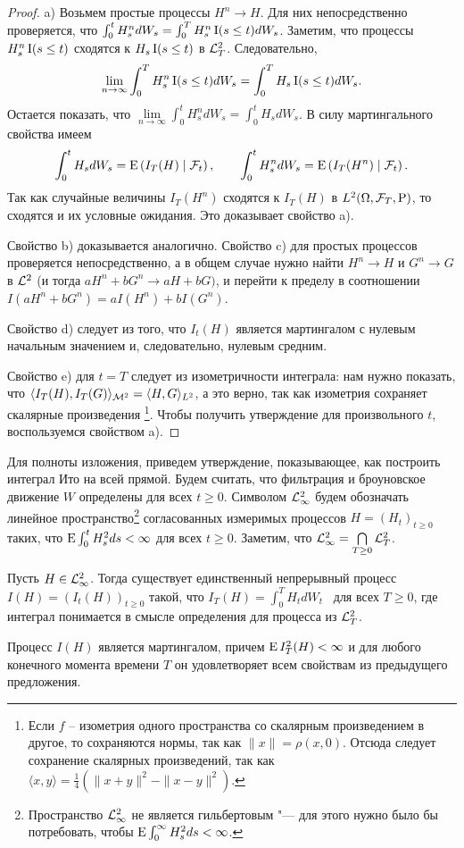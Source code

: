 \begin{proof}
a) Возьмем простые процессы $H^n\to H$.
Для них непосредственно проверяется, что $\int_0^t H_s^n d W_s = \int_0^T H_s^n \operatorname{I}(s\le t)d W_s$.
Заметим, что процессы $H_s^n \operatorname{I}(s\le t)$ сходятся к $H_s\operatorname{I}(s\le t)$ в $\mathcal{L}^2_T$.
Следовательно, 
\[
\lim\limits_{n\to\infty} \int_0^T H_s^n \operatorname{I}(s\le t)d W_s = \int_0^T H_s\operatorname{I}(s\le t) dW_s.
\]
Остается показать, что $\lim\limits_{n\to\infty} \int_0^t H_s^n d W_s = \int_0^t H_s d W_s$. 
В силу мартингального свойства имеем
\[
\int_0^t H_s dW_s = \operatorname{E}\left(I_T(H) \mid \mathcal{F}_t \right), \qquad
\int_0^t H_s^n dW_s = \operatorname{E}\left(I_T(H^n) \mid \mathcal{F}_t \right).
\]
Так как случайные величины $I_T(H^n)$ сходятся к $I_T(H)$ в $L^2(\Omega,\mathcal{F}_T,\mathrm{P})$, то сходятся и их условные ожидания.
Это доказывает свойство a).

Свойство b) доказывается аналогично.
Свойство c) для простых процессов проверяется непосредственно, а в общем случае нужно найти $H^n\to H$ и $G^n\to G$ в $\mathcal{L}^2$ (и тогда $aH^n+bG^n \to aH+bG)$, и перейти к пределу в соотношении $I(aH^n+bG^n) = aI(H^n) + bI(G^n)$.

Свойство d) следует из того, что $I_t(H)$ является мартингалом с нулевым начальным значением и, следовательно, нулевым средним. 

Свойство e) для $t=T$ следует из изометричности интеграла: нам нужно показать, что $\langle I_T(H), I_T(G) \rangle_{\mathcal{M}^2} = \langle H, G \rangle_{L^2}$, а это верно, так как изометрия сохраняет скалярные произведения%
\footnote{Если $f$ -- изометрия одного пространства со скалярным произведением в другое, то сохраняются нормы, так как $\|x\| = \rho(x,0)$.
Отсюда следует сохранение скалярных произведений, так как $\langle x,y\rangle = \frac{1}{4}(\|x+y\|^2 - \|x-y\|^2)$.}.
Чтобы получить утверждение для произвольного $t$, воспользуемся свойством a).
\end{proof}

Для полноты изложения, приведем утверждение, показывающее, как построить интеграл Ито на всей прямой.
Будем считать, что фильтрация и броуновское движение $W$ определены для всех $t\ge 0$.
Символом $\mathcal{L}^2_\infty$ будем обозначать линейное пространство\footnote{Пространство $\mathcal{L}^2_\infty$ не является гильбертовым "--- для этого нужно было бы потребовать, чтобы $\operatorname{E} \int_0^\infty H_s^2 ds < \infty$.} согласованных измеримых процессов $H=(H_t)_{t\ge 0}$ таких, что $\operatorname{E} \int_0^t H_s^2 ds < \infty$ для всех $t\ge0$.
Заметим, что $\mathcal{L}^2_\infty = \bigcap\limits_{T\ge0} \mathcal{L}^2_T$.

\begin{proposition}
Пусть $H\in\mathcal{L}^2_\infty$.
Тогда существует единственный непрерывный процесс $I(H) = (I_t(H))_{t\ge 0}$ такой, что $I_T(H) = \int_0^T H_t d W_t$ \as\ для всех $T\ge 0$, где интеграл понимается в смысле определения для процесса из $\mathcal{L}^2_T$.

Процесс $I(H)$ является мартингалом, причем $\operatorname{E} I_T^2(H) < \infty$ и для любого конечного момента времени $T$ он удовлетворяет всем свойствам из предыдущего предложения.
\end{proposition}


